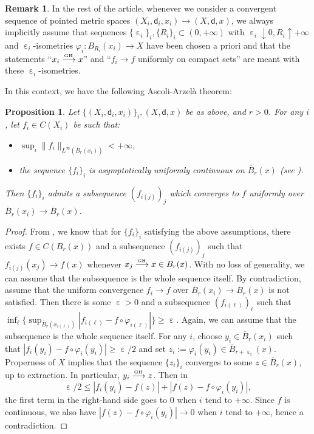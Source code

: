 \documentclass[10pt]{amsart}
\def\To#1{\mathchoice{\xrightarrow{\textstyle\kern4pt#1\kern3pt}}{\stackrel{#1}{\longrightarrow}}{}{}}
\newcommand{\sGH}{{\scriptscriptstyle\mathrm{GH}\,}}
\theoremstyle{plain}
\newtheorem{proposition}[theorem]{Proposition}
\theoremstyle{definition}
\newtheorem{remark}[theorem]{Remark}
\let\eps\upepsilon
\let\phi\varphi
\newcommand{\dist}{\mathsf{d}}
\begin{document}
\begin{remark}
In the rest of the article, whenever we consider a convergent sequen\-ce of pointed metric spaces $(X_i,\dist_i,x_i) \to (X,\dist,x)$, we always implicitly assume that sequences $\{\eps_i\}_i, \{R_i\}_i \subset (0,+\infty)$ with $\eps_i\downarrow 0, R_i \uparrow +\infty$ and $\eps_i$-isometries $\phi_i:B_{R_i}(x_i)\to X$ have been chosen a priori and that the statements ``$x_i \To{\sGH} x$'' and ``$f_i \to f$ uniformly on compact sets'' are meant with these $\eps_i$-isometries.
\end{remark}

In this context, we have the following Ascoli-Arzelà theorem:

\begin{proposition}\label{prop:AA1}
Let $\{(X_i,\dist_i,x_i)\}_i, (X,\dist,x)$ be as above, and $r>0$. For any $i$, let $f_i \in C(X_i)$ be such that:
\begin{itemize}
\item $\sup_i \|f_i\|_{L^{\infty}(\overline{B}_r(x_i))} < +\infty$,
\item the sequence $\{f_i\}_i$ is asymptotically uniformly continuous on $\overline{B}_r(x)$ (see \cite[Def.\,3.2]{Honda}).
\end{itemize}
Then $\{f_i\}_i$ admits a subsequence $(f_{i(j)})_j$ which converges to $f$ uniformly over $\overline{B}_r(x_i) \to \overline{B}_r(x)$.
\end{proposition}

\begin{proof}
From \cite[Prop.\,3.3]{Honda}, we know that for $\{f_i\}_i$ satisfying the above assumptions, there exists $f \in C(B_r(x))$ and a subsequence $(f_{i(j)})_j$ such that $f_{i(j)}(x_j) \to f(x)$ whenever $x_j \To{\sGH} x \in B_r(x)$. With no loss of generality, we can assume that the subsequence is the whole sequence itself. By contradiction, assume that the uniform convergence $f_i\to f$ over $\overline{B}_r(x_i)\to \overline{B}_r(x)$ is not satisfied. Then there is some $\eps>0$ and a subsequence $(f_{i(\ell)})_\ell$ such that $\inf_\ell \{\sup_{\overline{B}_r(x_{i(\ell)})} |f_{i(\ell)}-f \circ \phi_{i(\ell)}|\} \ge \eps$. Again, we can assume that the subsequence is the whole sequence itself. For any $i$, choose $y_i \in \overline{B}_r(x_i)$ such that $|f_i(y_i)-f \circ \phi_i(y_i)| \ge \eps/2$ and set $z_i:=\phi_i(y_i) \in \overline{B}_{r+\eps_i}(x)$. Properness of $X$ implies that the sequence $\{z_i\}_i$ converges to some $z \in \overline{B}_r(x)$, up to extraction. In particular, $y_i \To{\sGH} z$. Then in
\[
\eps/2 \le |f_i(y_i)-f(z)| + |f(z)-f\circ \phi_i(y_i)|,
\]
the first term in the right-hand side goes to $0$ when $i$ tend to $+\infty$. Since $f$ is continuous, we also have $|f(z)-f\circ \phi_i(y_i)|\to 0$ when $i$ tend to $+\infty$, hence a contradiction.
\end{proof}
\end{document}
